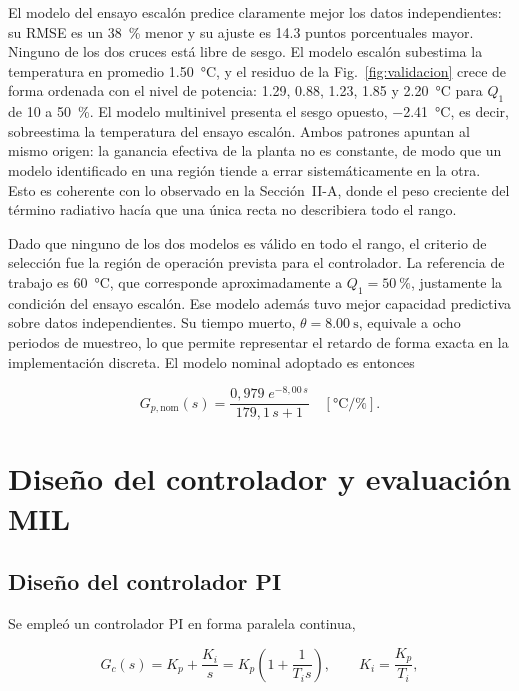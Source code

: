 \documentclass[conference,a4paper,10pt]{IEEEtran}
\newcommand{\Gpnom}{G_{p,\mathrm{nom}}}
\newcommand{\Kp}{K_p}
\newcommand{\Ki}{K_i}
\newcommand{\Ti}{T_i}
\begin{document}
El modelo del ensayo escalón predice claramente mejor los datos independientes: su RMSE es un
\SI{38}{\percent} menor y su ajuste es \num{14.3} puntos porcentuales mayor. Ninguno de los dos
cruces está libre de sesgo. El modelo escalón subestima la temperatura en promedio
\SI{1.50}{\celsius}, y el residuo de la Fig.~\ref{fig:validacion} crece de forma ordenada con el
nivel de potencia: \num{+1.29}, \num{+0.88}, \num{+1.23}, \num{+1.85} y \SI{+2.20}{\celsius} para
$Q_1$ de \num{10} a \SI{50}{\percent}. El modelo multinivel presenta el sesgo opuesto,
\SI{-2.41}{\celsius}, es decir, sobreestima la temperatura del ensayo escalón. Ambos patrones
apuntan al mismo origen: la ganancia efectiva de la planta no es constante, de modo que un modelo
identificado en una región tiende a errar sistemáticamente en la otra. Esto es coherente con lo
observado en la Sección~II-A, donde el peso creciente del término radiativo hacía que una única
recta no describiera todo el rango.

Dado que ninguno de los dos modelos es válido en todo el rango, el criterio de selección fue la
región de operación prevista para el controlador. La referencia de trabajo es \SI{60}{\celsius},
que corresponde aproximadamente a $Q_1 = \SI{50}{\percent}$, justamente la condición del ensayo
escalón. Ese modelo además tuvo mejor capacidad predictiva sobre datos independientes. Su tiempo
muerto, $\theta = \SI{8.00}{\second}$, equivale a ocho periodos de muestreo, lo que permite
representar el retardo de forma exacta en la implementación discreta. El modelo nominal adoptado es
entonces

\begin{equation}
\Gpnom(s) = \frac{0{,}979\;e^{-8{,}00\,s}}{179{,}1\,s + 1}
\quad \left[\si{\celsius\per\percent}\right].
\label{eq:gpnom}
\end{equation}

\section{Diseño del controlador y evaluación MIL}

\subsection{Diseño del controlador PI}

Se empleó un controlador PI en forma paralela continua,

\begin{equation}
G_c(s) = \Kp + \frac{\Ki}{s} = \Kp\left(1 + \frac{1}{\Ti s}\right),
\qquad \Ki = \frac{\Kp}{\Ti},
\label{eq:pi}
\end{equation}
\end{document}
